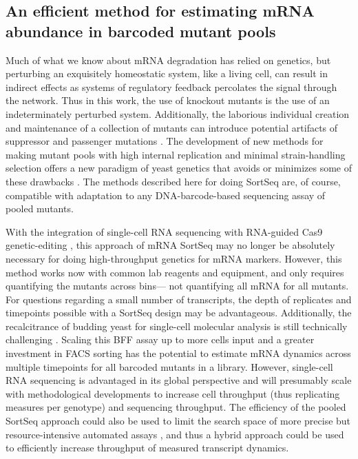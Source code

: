 \subsection{An efficient method for estimating mRNA abundance in
barcoded mutant pools}

Much of what we know about mRNA degradation has relied on genetics,
but perturbing an exquisitely homeostatic system, like a living cell, 
can result in indirect effects as systems of regulatory feedback 
percolates the signal through the network. 
Thus in this work, the use of knockout mutants is the use of
an indeterminately perturbed system. 
Additionally, the laborious individual creation and maintenance of a 
collection of mutants can introduce potential artifacts of suppressor 
and passenger mutations \parencite{kwan2016rdna,markowitz2017reduced}.
The development of new methods for making mutant pools with 
high internal replication and minimal strain-handling selection
offers a new paradigm of yeast genetics that avoids or
minimizes some of these drawbacks \parencite{smith2016quantitative}.
The methods described here for doing SortSeq are, of course,
compatible with adaptation to any DNA-barcode-based sequencing assay 
of pooled mutants. 

With the integration of single-cell RNA sequencing with 
RNA-guided Cas9 genetic-editing 
\parencite{dixit2016perturb,hill2018design},
this approach of mRNA SortSeq may no longer be absolutely
necessary for doing high-throughput genetics for mRNA markers. 
However, this method works now with common lab reagents and equipment, 
and only requires quantifying the mutants across bins---
not quantifying all mRNA for all mutants.
For questions regarding a small number of transcripts,
the depth of replicates and timepoints possible with a SortSeq
design may be advantageous.
Additionally, the recalcitrance of budding yeast for 
single-cell molecular analysis is still technically challenging
\parencite{gasch2017single}.
Scaling this BFF assay up to more cells input and a greater investment
in FACS sorting \parencite{de2017deciphering} has the potential to 
estimate mRNA dynamics across multiple
timepoints for all barcoded mutants in a library.
However, single-cell RNA sequencing is advantaged in its global 
perspective and will presumably scale with methodological 
developments to increase cell throughput 
(thus replicating measures per genotype)
and sequencing throughput.
The efficiency of the pooled SortSeq approach could also be used to 
limit the search space of more precise but resource-intensive 
automated assays \parencite{worley2016genome}, 
and thus a hybrid approach could be used to
efficiently increase throughput of measured transcript dynamics. 

